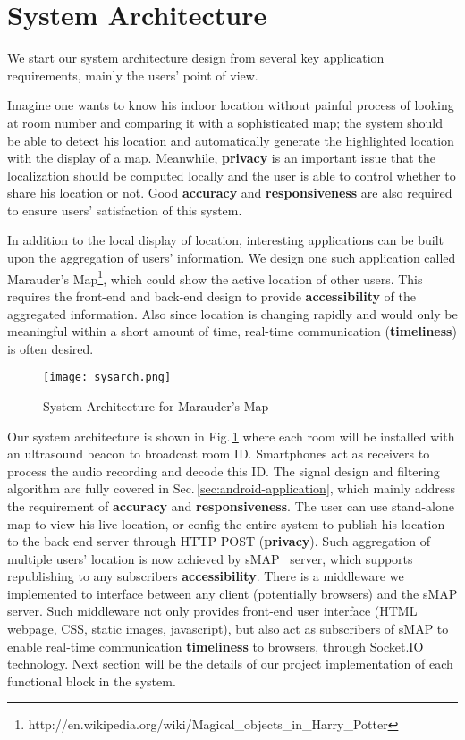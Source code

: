 \section{System Architecture}
\label{sec:system-architecture}
We start our system architecture design from several key application requirements, mainly the users' point of view.

Imagine one wants to know his indoor location without painful process of looking at room number and comparing it with a sophisticated map; the system should be able to detect his location and automatically generate the highlighted location with the display of a map. Meanwhile, {\bf privacy} is an important issue that the localization should be computed locally and the user is able to control whether to share his location or not. Good {\bf accuracy} and {\bf responsiveness} are also required to ensure users' satisfaction of this system.  

In addition to the local display of location, interesting applications can be built upon the aggregation of users' information. We design one such application called Marauder's Map\footnote{http://en.wikipedia.org/wiki/Magical\_objects\_in\_Harry\_Potter}, which could show the active location of other users. This requires the front-end and back-end design to provide {\bf accessibility} of the aggregated information. Also since location is changing rapidly and would only be meaningful within a short amount of time, real-time communication ({\bf timeliness}) is often desired.

\begin{figure}
  \centering
  \texttt{[image: sysarch.png]}
  \caption{System Architecture for Marauder's Map}
  \label{fig:sysarch}
\end{figure}

Our system architecture is shown in Fig.\,\ref{fig:sysarch} where each room will be installed with an ultrasound beacon to broadcast room ID. Smartphones act as receivers to process the audio recording and decode this ID. The signal design and filtering algorithm are fully covered in Sec.\,\ref{sec:android-application}, which mainly address the requirement of {\bf accuracy} and {\bf responsiveness}. The user can use stand-alone map to view his live location, or config the entire system to publish his location to the back end server through HTTP POST ({\bf privacy}). Such aggregation of multiple users' location is now achieved by sMAP~\cite{dawson2010smap} server, which supports republishing to any subscribers {\bf accessibility}. There is a middleware we implemented to interface between any client (potentially browsers) and the sMAP server. Such middleware not only provides front-end user interface (HTML webpage, CSS, static images, javascript), but also act as subscribers of sMAP to enable real-time communication {\bf timeliness} to browsers, through Socket.IO~\cite{socketio} technology. Next section will be the details of our project implementation of each functional block in the system.

